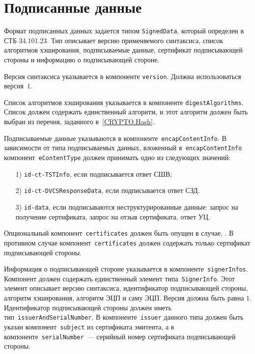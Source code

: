 \section{Подписанные данные}\label{FMT.SignedData}

Формат подписанных данных задается типом \texttt{SignedData}, 
который определен в СТБ 34.101.23. Тип описывает версию применяемого 
синтаксиса, список алгоритмов хэширования, подписываемые данные, 
сертификат подписывающей стороны и информацию о подписывающей стороне. 

Версия синтаксиса указывается в компоненте \texttt{version}.
Должна использоваться версия~$1$.

Список алгоритмов хэширования указывается в компоненте
\texttt{digestAlgorithms}. Список должен содержать единственный алгоритм,
и этот алгоритм должен быть выбран из перечня, 
заданного в~\ref{CRYPTO.Hash}.

Подписываемые данные указываются в компоненте~\texttt{encapContentInfo}. 
%
В зависимости от типа подписываемых данных, вложенный 
в~\texttt{encapContentInfo} компонент~\texttt{eContentType} 
должен принимать одно из следующих значений:
\begin{enumerate}
\item[1)]
\texttt{id-ct-TSTInfo}, если подписывается ответ СШВ;
\item[2)]
\texttt{id-ct-DVCSResponseData}, если подписывается ответ СЗД. 
\item[3)]
\texttt{id-data}, если подписываются неструктурированные данные:
запрос на получение сертификата, запрос на отзыв сертификата, ответ УЦ.
\end{enumerate}



Опциональный компонент~\texttt{certificates} должен быть опущен в случае, 
. В противном случае 
компонент~\texttt{certificates} должен содержать только сертификат 
подписывающей стороны.

Информация о подписывающей стороне указывается в
компоненте~\texttt{signerInfos}. Компонент должен содержать единственный
элемент типа~\texttt{SignerInfo}. Этот элемент описывает версию синтаксиса,
идентификатор подписывающей стороны, алгоритм хэширования, алгоритм ЭЦП и
саму ЭЦП. Версия должна быть равна $1$. Идентификатор подписывающей стороны
должен иметь тип~\texttt{issuerAndSerialNumber}. В 
компоненте~\texttt{issuer} данного типа должен быть указан 
компонент~\texttt{subject} из сертификата эмитента, а в  
компоненте~\texttt{serialNumber}~--- серийный номер сертификата 
подписывающей стороны. 

